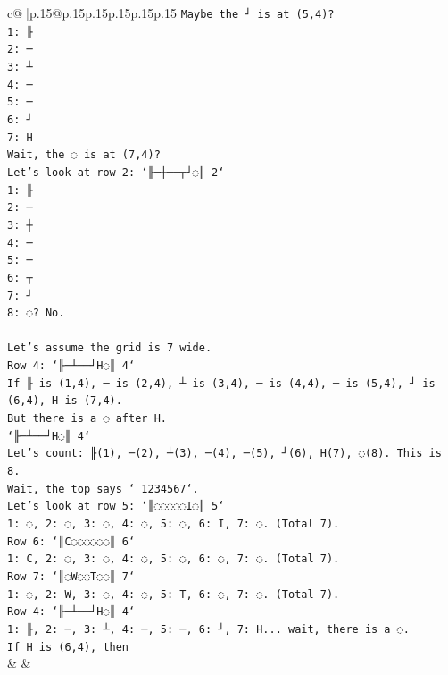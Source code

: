 \documentclass{article}
\begin{document}
{\begin{supertabular}{c@{$\;$}|p{.15\linewidth}@{}p{.15\linewidth}p{.15\linewidth}p{.15\linewidth}p{.15\linewidth}p{.15\linewidth}}
{{{\texttt{Maybe the ┘ is at (5,4)?} \\
\texttt{1: ╟} \\
\texttt{2: ─} \\
\texttt{3: ┴} \\
\texttt{4: ─} \\
\texttt{5: ─} \\
\texttt{6: ┘} \\
\texttt{7: H} \\
\texttt{Wait, the ◌ is at (7,4)?} \\
\texttt{Let's look at row 2: `╟─┼──┬┘◌║ 2`} \\
\texttt{1: ╟} \\
\texttt{2: ─} \\
\texttt{3: ┼} \\
\texttt{4: ─} \\
\texttt{5: ─} \\
\texttt{6: ┬} \\
\texttt{7: ┘} \\
\texttt{8: ◌? No.} \\
\\ 
\texttt{Let's assume the grid is 7 wide.} \\
\texttt{Row 4: `╟─┴──┘H◌║ 4`} \\
\texttt{If ╟ is (1,4), ─ is (2,4), ┴ is (3,4), ─ is (4,4), ─ is (5,4), ┘ is (6,4), H is (7,4).} \\
\texttt{But there is a ◌ after H.} \\
\texttt{`╟─┴──┘H◌║ 4`} \\
\texttt{Let's count: ╟(1), ─(2), ┴(3), ─(4), ─(5), ┘(6), H(7), ◌(8). This is 8.} \\
\texttt{Wait, the top says ` 1234567`.} \\
\texttt{Let's look at row 5: `║◌◌◌◌◌I◌║ 5`} \\
\texttt{1: ◌, 2: ◌, 3: ◌, 4: ◌, 5: ◌, 6: I, 7: ◌. (Total 7).} \\
\texttt{Row 6: `║C◌◌◌◌◌◌║ 6`} \\
\texttt{1: C, 2: ◌, 3: ◌, 4: ◌, 5: ◌, 6: ◌, 7: ◌. (Total 7).} \\
\texttt{Row 7: `║◌W◌◌T◌◌║ 7`} \\
\texttt{1: ◌, 2: W, 3: ◌, 4: ◌, 5: T, 6: ◌, 7: ◌. (Total 7).} \\
\texttt{Row 4: `╟─┴──┘H◌║ 4`} \\
\texttt{1: ╟, 2: ─, 3: ┴, 4: ─, 5: ─, 6: ┘, 7: H... wait, there is a ◌.} \\
\texttt{If H is (6,4), then} \\
            }
        }
    }
    & & \\ \\


\end{supertabular}}
\end{document}

